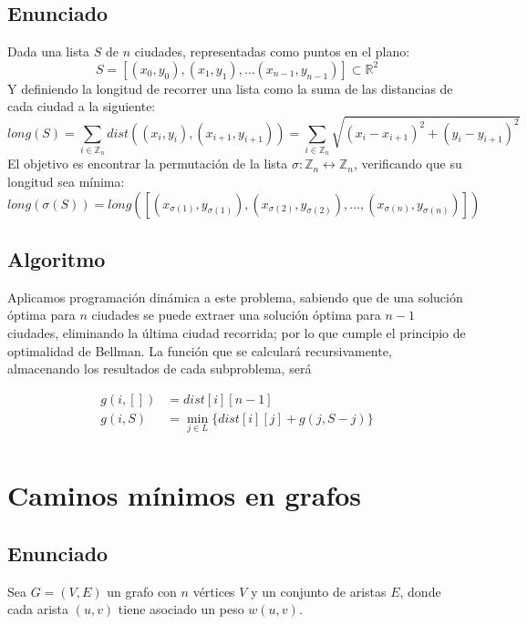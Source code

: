 \documentclass[a4paper, 11pt]{article} %
\begin{document}
  \subsection{Enunciado}
  	Dada una lista $S$ de $n$ ciudades, representadas como puntos en el plano:
  	\begin{equation}
  	    S = [(x_0,y_0), (x_1,y_1), \dots (x_{n-1},y_{n-1})] \subset \mathbb{R}^2
  	\end{equation}
  	Y definiendo la longitud de recorrer una lista como la suma de las distancias de cada ciudad a la siguiente:
  	\begin{equation}
  	    long(S) = \sum_{i \in \mathbb{Z}_n} dist((x_i,y_i), (x_{i+1}, y_{i+1})) = \sum_{i \in \mathbb{Z}_n} \sqrt{(x_i-x_{i+1})^2 + (y_i-y_{i+1})^2}
  	\end{equation}
  	El objetivo es encontrar la permutación de la lista $\sigma : \mathbb{Z}_n \leftrightarrow \mathbb{Z}_n$, verificando que su longitud sea mínima:
  	\begin{equation}
  	    long(\sigma(S)) = long([(x_{\sigma(1)},y_{\sigma(1)}), (x_{\sigma(2)},y_{\sigma(2)}), \dots, (x_{\sigma(n)},y_{\sigma(n)})])
      \end{equation}
    
    \subsection{Algoritmo}
    Aplicamos programación dinámica a este problema, sabiendo
    que de una solución óptima para $n$ ciudades se puede extraer
    una solución óptima para $n-1$ ciudades, eliminando
    la última ciudad recorrida; por lo que cumple el principio
    de optimalidad de Bellman. La función que se calculará recursivamente,
    almacenando los resultados de cada subproblema, será
    
    \begin{equation}
    \begin{split}
    	g(i, [])  &=  dist[i][n-1] \\
    	g(i, S)  &=  \min_{j \in L} \{ dist[i][j] + g(j, S-{j}) \} \\
    	\end{split}
    \end{equation}
      

\section{Caminos mínimos en grafos}
  \subsection{Enunciado}
    Sea $G=(V,E)$ un grafo con $n$ vértices $V$ y un conjunto de aristas $E$,
    donde cada arista $(u,v)$ tiene asociado un peso $w(u,v)$.
    
\end{document}
